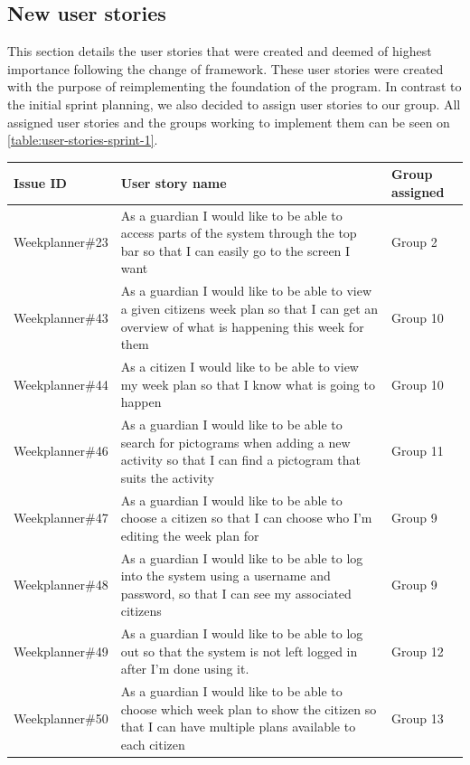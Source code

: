 \subsection{New user stories}
This section details the user stories that were created and deemed of highest importance following the change of framework.
These user stories were created with the purpose of reimplementing the foundation of the program.
In contrast to the initial sprint planning, we also decided to assign user stories to our group.
All assigned user stories and the groups working to implement them can be seen on \autoref{table:user-stories-sprint-1}.
\begin{longtable}{|p{2.8cm}|p{8cm}|p{1.6cm}|}
    \hline
    Issue ID        & User story name                                                                                                                                                          & Group assigned       \\ \hline
    Weekplanner\#23 & As a guardian I would like to be able to access parts of the system through the top bar so that I can easily go to the screen I want & Group 2            \\ \hline
    Weekplanner\#43 & As a guardian I would like to be able to view a given citizens week plan so that I can get an overview of what is happening this week for them & Group 10             \\ \hline
    Weekplanner\#44 & As a citizen I would like to be able to view my week plan so that I know what is going to happen & Group 10               \\ \hline
    Weekplanner\#46 & As a guardian I would like to be able to search for pictograms when adding a new activity so that I can find a pictogram that suits the activity & Group 11              \\ \hline
    Weekplanner\#47 & As a guardian I would like to be able to choose a citizen so that I can choose who I’m editing the week plan for  & Group 9             \\ \hline
    Weekplanner\#48 & As a guardian I would like to be able to log into the system using a username and password, so that I can see my associated citizens & Group 9             \\ \hline
    Weekplanner\#49 & As a guardian I would like to be able to log out so that the system is not left logged in after I’m done using it. & Group 12              \\ \hline
    Weekplanner\#50 & As a guardian I would like to be able to choose which week plan to show the citizen so that I can have multiple plans available to each citizen & Group 13             \\ \hline

\end{longtable}
